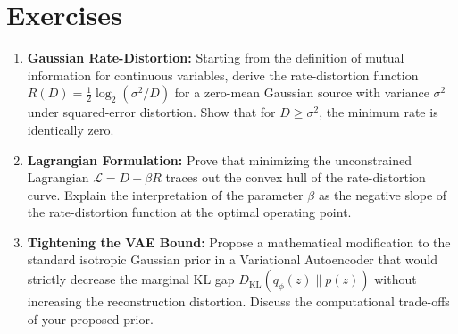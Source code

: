 \section{Exercises}
\begin{enumerate}
    \item \textbf{Gaussian Rate-Distortion:} Starting from the definition of mutual information for continuous variables, derive the rate-distortion function $R(D) = \frac{1}{2}\log_2(\sigma^2 / D)$ for a zero-mean Gaussian source with variance $\sigma^2$ under squared-error distortion. Show that for $D \ge \sigma^2$, the minimum rate is identically zero.
    \item \textbf{Lagrangian Formulation:} Prove that minimizing the unconstrained Lagrangian $\mathcal{L} = D + \beta R$ traces out the convex hull of the rate-distortion curve. Explain the interpretation of the parameter $\beta$ as the negative slope of the rate-distortion function at the optimal operating point.
    \item \textbf{Tightening the VAE Bound:} Propose a mathematical modification to the standard isotropic Gaussian prior in a Variational Autoencoder that would strictly decrease the marginal KL gap $D_{\text{KL}}(q_\phi(z) \parallel p(z))$ without increasing the reconstruction distortion. Discuss the computational trade-offs of your proposed prior.
\end{enumerate}

